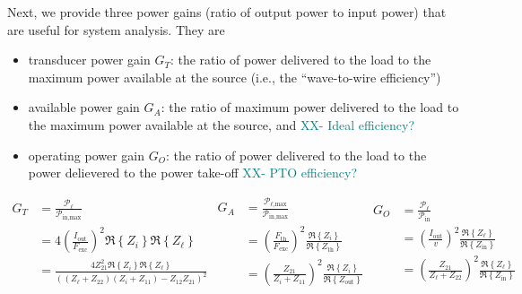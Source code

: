 \documentclass[lettersize,journal]{IEEEtran}
\newcommand{\ak}[1]{\textcolor{teal}{#1}}
\begin{document}
Next, we provide three power gains (ratio of output power to input power) that are useful for system analysis. 
They are 
\begin{itemize}
        \item transducer power gain $G_T$: the ratio of power delivered to the load to the maximum power available at the source (i.e., the ``wave-to-wire efficiency'')
        \item available power gain $G_A$: the ratio of maximum power delivered to the load to the maximum power available at the source, and \ak{XX- Ideal efficiency?}
        \item operating power gain $G_O$: the ratio of power delivered to the load to the power delievered to the power take-off \ak{XX- PTO efficiency?}
\end{itemize}
\begin{subequations}
        \begin{align}
                G_T &= \frac{\mathcal{P}_\ell}{\mathcal{P}_{\textrm{in,max}}} \nonumber \\
                &= 4\left(\frac{I_{\textrm{out}}}{F_{\textrm{exc}}}\right)^2\Re \left\{ Z_i \right\}\Re \left\{ Z_{\ell} \right\}  \nonumber \\
                &= \frac{4 Z_{21}^2 \Re \left\{ Z_i \right\}\Re \left\{ Z_{\ell} \right\}}{((Z_{\ell} + Z_{22})(Z_i + Z_{11}) - Z_{12}Z_{21})^2} \label{eq:transducer_gain}
        \end{align}
        \begin{align}
                G_A &= \frac{\mathcal{P}_{\ell\textrm{,max}}}{\mathcal{P}_{\textrm{in,max}}}  \nonumber \\
                &= \left(\frac{F_{\textrm{th}}}{F_{\textrm{exc}}}\right)^2\frac{\Re \left\{ Z_i \right\}}{\Re \left\{ Z_{\textrm{th}} \right\}} \nonumber \\
                &= \left(\frac{Z_{21}}{Z_i + Z_{11}}\right)^2\frac{\Re \left\{ Z_i \right\}}{\Re \left\{ Z_{\textrm{out}} \right\}} \label{eq:available_gain}
        \end{align}
        \begin{align}
                G_O &= \frac{\mathcal{P}_\ell}{\mathcal{P}_{\textrm{in}}}  \nonumber \\
                &= \left(\frac{I_{\textrm{out}}}{v}\right)^2\frac{\Re \left\{ Z_{\ell} \right\}}{\Re \left\{ Z_{\textrm{in}} \right\}} \nonumber \\
                &=  \left(\frac{Z_{21}}{Z_{\ell} + Z_{22}}\right)^2\frac{\Re \left\{ Z_{\ell} \right\}}{\Re \left\{ Z_{\textrm{in}} \right\}} \label{eq:operating_gain}
        \end{align}
\end{subequations}
\end{document}
